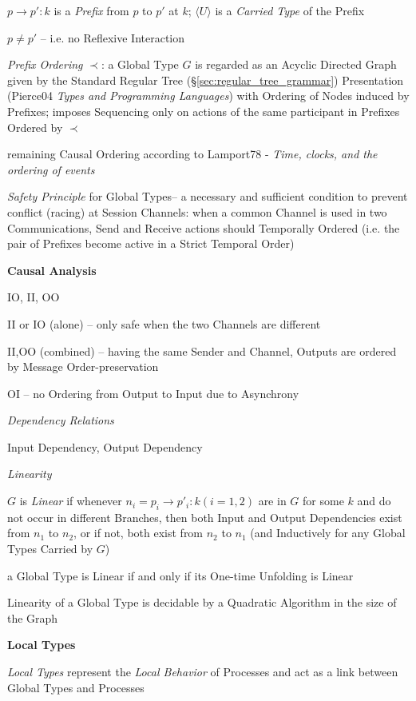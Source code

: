 $p \rightarrow p' : k$ is a \emph{Prefix} from $p$ to $p'$ at $k$;
$\langle U \rangle$ is a \emph{Carried Type} of the Prefix

$p \neq p'$ -- i.e. no Reflexive Interaction

\emph{Prefix Ordering} $\prec$: a Global Type $G$ is regarded as an
Acyclic Directed Graph given by the Standard Regular Tree
(\S\ref{sec:regular_tree_grammar}) Presentation (Pierce04 \emph{Types
  and Programming Languages}) with Ordering of Nodes induced by
Prefixes; imposes Sequencing only on actions of the same participant
in Prefixes Ordered by $\prec$

remaining Causal Ordering according to Lamport78 - \emph{Time, clocks,
  and the ordering of events}


\emph{Safety Principle} for Global Types-- a necessary and sufficient
condition to prevent conflict (racing) at Session Channels: when a
common Channel is used in two Communications, Send and Receive actions
should Temporally Ordered (i.e. the pair of Prefixes become active in
a Strict Temporal Order)


\textbf{Causal Analysis}

IO, II, OO

II or IO (alone) -- only safe when the two Channels are different

II,OO (combined) -- having the same Sender and Channel, Outputs are
ordered by Message Order-preservation

OI -- no Ordering from Output to Input due to Asynchrony

\emph{Dependency Relations}

Input Dependency, Output Dependency

\emph{Linearity}

$G$ is \emph{Linear} if whenever $n_i = p_i \rightarrow p'_i : k (i =
1,2)$ are in $G$ for some $k$ and do not occur in different Branches,
then both Input and Output Dependencies exist from $n_1$ to $n_2$, or
if not, both exist from $n_2$ to $n_1$ (and Inductively for any Global
Types Carried by $G$)

a Global Type is Linear if and only if its One-time Unfolding is Linear

Linearity of a Global Type is decidable by a Quadratic Algorithm in
the size of the Graph



\textbf{Local Types}

\emph{Local Types} represent the \emph{Local Behavior} of Processes
and act as a link between Global Types and Processes

